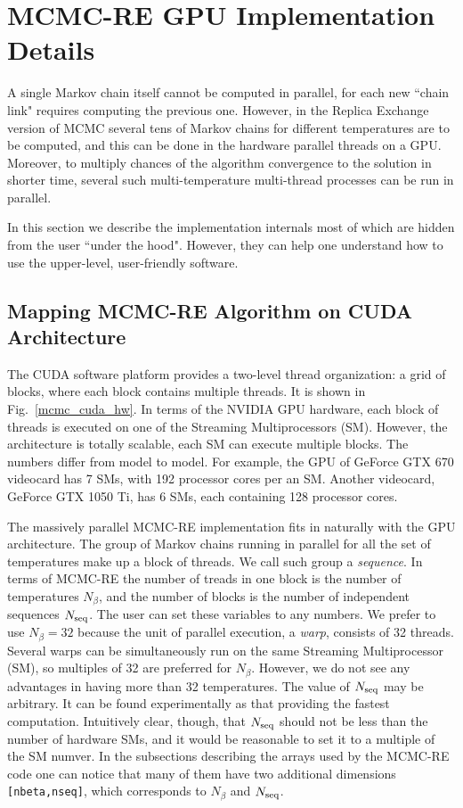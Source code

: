 \documentclass[preprint2]{aastex}
\begin{document}
\section{MCMC-RE GPU Implementation Details}

A single Markov chain itself cannot be computed in parallel, for each new ``chain link"
requires computing the previous one. However, in the Replica Exchange
version of MCMC several tens of Markov chains for different temperatures
are to be computed, and this can be done in the hardware parallel threads
on a GPU. Moreover, to multiply chances of the algorithm convergence
to the solution in shorter time, several such multi-temperature multi-thread 
processes can be run in parallel.

In this section we describe the implementation internals most of which are hidden 
from the user ``under the hood". However, they can help one understand how to 
use the upper-level, user-friendly software.


\subsection{Mapping MCMC-RE Algorithm on CUDA Architecture}

The CUDA software platform provides a two-level thread organization: a grid of 
blocks, where each block contains multiple threads. It is shown in Fig.~\ref{mcmc_cuda_hw}.
In terms of the NVIDIA GPU hardware, each block of threads is executed on
one of the Streaming Multiprocessors (SM). However, the architecture is
totally scalable, each SM can execute multiple blocks. The numbers differ
from model to model. For example, the GPU of GeForce GTX 670 videocard
has 7 SMs, with 192 processor cores per an SM. Another videocard,
GeForce GTX 1050 Ti, has 6 SMs, each containing 128 processor cores. 

The massively parallel MCMC-RE implementation fits in naturally with the
GPU architecture. The group of Markov chains running in parallel for all the set 
of temperatures make up a block of threads. We call such group a \emph{sequence}.
In terms of MCMC-RE the number of treads in one block is the number of 
temperatures $N_\beta$, and the number of blocks is the number of independent
sequences $N_{\rm seq}$. The user can set these variables to any numbers.
We prefer to use $N_\beta = 32$ because the unit of parallel execution, a
\emph{warp}, consists of 32 threads. Several warps can be simultaneously 
run on the same Streaming Multiprocessor (SM), so multiples of 32 are
preferred for $N_\beta$. However, we do not see any advantages in having
more than 32 temperatures.  The value of $N_{\rm seq}$ may be arbitrary.
It can be found experimentally as that providing the fastest computation. 
Intuitively clear, though, that $N_{\rm seq}$ should not be less than the
number of hardware SMs, and it would be reasonable to set it to a multiple
of the SM numver. In the subsections describing the arrays
used by the MCMC-RE code one can notice that many of them have 
two additional dimensions \verb|[nbeta,nseq]|, which corresponds to
$N_\beta$ and $N_{\rm seq}$.
\end{document}

